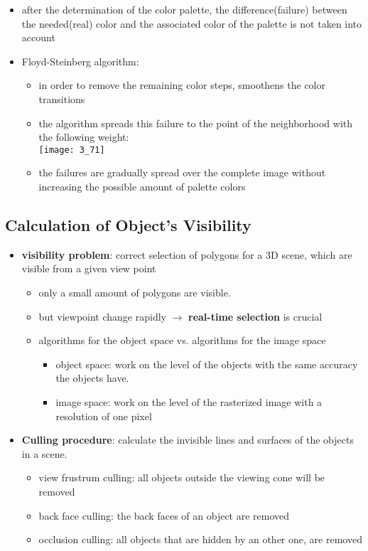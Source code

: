 \documentclass{standalone}
\begin{document}
\begin{itemize}
	\item after the determination of the color palette, the difference(failure) between the needed(real) color and the associated color of the palette is not taken into account
	\item Floyd-Steinberg algorithm:
	\begin{itemize}
		\item in order to remove the remaining color steps, smoothens the color transitions
		\item the algorithm spreads this failure to the point of the neighborhood with the following weight: \\
		\texttt{[image: 3\_71]}
		\item the failures are gradually spread over the complete image without increasing the possible amount of palette colors
	\end{itemize}
\end{itemize}


\setcounter{subsection}{9}
\subsection{Calculation of Object's Visibility}

\begin{itemize}
	\item \textbf{visibility problem}: correct selection of polygons for a 3D scene, which are visible from a given view point
		\begin{itemize}
			\item only a small amount of polygons are visible.
			\item but viewpoint change rapidly $\rightarrow$ \textbf{real-time selection} is crucial
			\item algorithms for the object space vs. algorithms for the image space
				\begin{itemize}
					\item object space: work on the level of the objects with the same accuracy the objects have.
					\item image space: work on the level of the rasterized image with a resolution of one pixel
				\end{itemize}
		\end{itemize}
	\item \textbf{Culling procedure}: calculate the invisible lines and surfaces of the objects in a scene.
		\begin{itemize}
			\item view frustrum culling: all objects outside the viewing cone will be removed
			\item back face culling: the back faces of an object are removed
			\item occlusion culling: all objects that are hidden by an other one, are removed
		\end{itemize}
\end{itemize}
\end{document}
